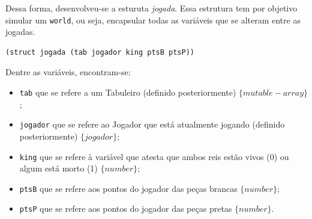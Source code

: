 	Dessa forma, desenvolveu-se a esturuta \textit{jogada}. Essa estrutura tem por objetivo simular um
	\verb|world|, ou seja, encapsular todas as variáveis que se alteram entre as jogadas.
\begin{Verbatim}[fontsize=\footnotesize]
	(struct jogada (tab jogador king ptsB ptsP))
\end{Verbatim}
Dentre as variáveis, encontram-se:
\begin{itemize}
	\item \verb|tab| que se refere a um Tabuleiro (definido posteriormente) $\{mutable-array\}$;
	\item \verb|jogador| que se refere ao Jogador que está atualmente jogando (definido posteriormente) $\{jogador\}$;
	\item \verb|king| que se refere à variável que atesta que ambos reis estão vivos (0) ou algum está morto (1) $\{number\}$;
	\item \verb|ptsB| que se refere aos pontos do jogador das peças brancas $\{number\}$;
	\item \verb|ptsP| que se refere aos pontos do jogador das peças pretas $\{number\}$.
\end{itemize}

